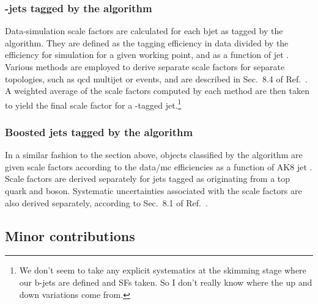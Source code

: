 

\subsubsection{\texorpdfstring{\Pbottom-jets}{b-jets} tagged by the \texorpdfstring{\deepcsv}{DeepCSV} algorithm}
\label{subsubsec:htoinv_btagging_sfs}

Data-simulation scale factors are calculated for each \gls{bjet} as tagged by the \deepcsv algorithm. They are defined as the tagging efficiency in data divided by the efficiency for simulation for a given working point, and as a function of \gls{jet} \pt. Various methods are employed to derive separate scale factors for separate topologies, such as \acrshort{qcd} multijet or \ttbar events, and are described in Sec.~8.4 of Ref.~. A weighted average of the scale factors computed by each method are then taken to yield the final scale factor for a \Pbottom-tagged \gls{jet}.\footnote{We don't seem to take any explicit systematics at the skimming stage where our b-jets are defined and SFs taken. So I don't really know where the up and down variations come from.}





\subsubsection{Boosted jets tagged by the \texorpdfstring{\deepakeight}{DeepAK8} algorithm}
\label{subsubsec:htoinv_deepak8_sfs}

In a similar fashion to the section above, objects classified by the \deepakeight algorithm are given scale factors according to the data/\acrshort{mc} efficiencies as a function of AK8 \gls{jet} \pt. Scale factors are derived separately for \glspl{jet} tagged as originating from a top quark and \PVec boson. Systematic uncertainties associated with the scale factors are also derived separately, according to Sec.~8.1 of Ref.~.




\subsection{Minor contributions}
\label{subsec:htoinv_minor_weights_systs}


